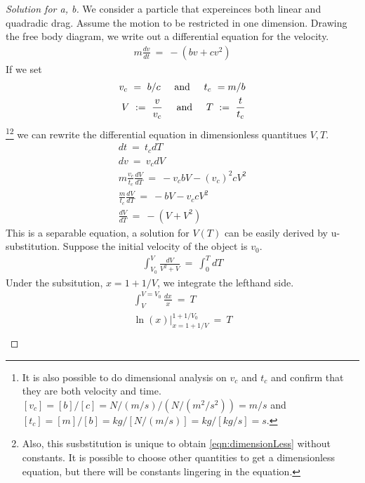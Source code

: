 \documentclass{article}
\numberwithin{equation}{section}
\newcommand{\textAnd}{
    {
        \hspace{5mm}
        \textrm{and}
        \hspace{5mm}
    }
}
\begin{document}
\begin{proof}[Solution for a, b]
    We consider a particle that expereinces both linear and quadradic 
    drag. Assume the motion to be restricted in one dimension. Drawing 
    the free body diagram, we write out a differential equation for 
    the velocity.
    \begin{eqnarray}
        m \frac {dv}{dt} \ = \ -(bv + cv^2)
    \end{eqnarray}
    If we set 
    \begin{eqnarray}\label{eqn:subst}
        v_c \ = \ b/c \textAnd t_c \ = m/ b \\ 
        V \ := \ \frac v {v_c} \textAnd 
        T \ := \ \frac t {t_c}
    \end{eqnarray}
    \footnote{
        It is also possible to do dimensional analysis on $v_c$ and 
        $t_c$ and confirm that they are both velocity and time. 
        $[v_c] = [b]/[c] = N/(m/s)/(N/(m^2/s^2)) = m/s$ and 
        $[t_c] = [m]/[b] = kg/[N/(m/s)] = kg/[kg/s] = s$. 
    }\footnote{
        Also, this susbstitution is unique to obtain \eqref{eqn:dimensionLess} without 
        constants. It is possible to choose other quantities to get a dimensionless 
        equation, but there will be constants lingering in the equation. 
    }
    we can rewrite the differential equation in dimensionless quantitues $V, T$. 
    \begin{align}
        dt \ = \ t_c dT  \nonumber \\ 
        dv \ = \ v_c dV  \nonumber \\ 
        m\frac {v_c}{t_c} \frac {dV}{dT} \ = \ -v_c b V - (v_c)^2 c V^2 \nonumber \\ 
        \frac m {t_c}\frac {dV}{dT} \ = \ -bV -v_c cV^2 \nonumber \\ 
        \label{eqn:dimensionLess}\frac {dV} {dT} \ = \ -(V + V^2)
    \end{align}
    This is a separable equation, a solution for $V(T)$ can be easily 
    derived by u-substitution. Suppose the initial velocity of the object is 
    $v_0$. 
    \begin{eqnarray}
        \int_{V_0}^{V} \frac {dV}{V^2 + V} \ = \ 
        \int_{0}^{T} dT  
    \end{eqnarray}
    Under the subsitution, $x = 1+1/V$, we integrate the lefthand side. 
    \begin{align}
         \int_{V}^{V = V_0} \frac {dx}{x} \ = \ T\\ 
            \ln(x)\bigg|_{x = 1 + 1/V}^{1 + 1/V_0} \ = \ T\\

\end{align}
\end{proof}
\end{document}
